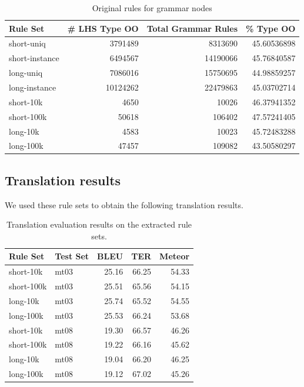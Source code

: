 \documentclass[11pt]{article}
\begin{document}
\begin{table}[tbh!]
  \begin{tabular}{lrrr}
  Rule Set & \# LHS Type OO & Total Grammar Rules & \% Type OO\\
  \hline
  short-uniq	& 3791489 &	8313690	& 45.60536898\\
  short-instance &	6494567 &	14190066 & 45.76840587\\
  long-uniq &	7086016 &	15750695 & 44.98859257\\
  long-instance & 10124262 & 22479863 & 45.03702714\\
  short-10k & 4650 & 10026 & 46.37941352\\
  short-100k & 50618 & 106402 & 47.57241405\\
  long-10k & 4583 & 10023 & 45.72483288\\
  long-100k & 47457 & 109082 & 43.50580297
  \end{tabular}
  \caption{Original rules for grammar nodes}
\end{table}

\subsection{Translation results}

We used these rule sets to obtain the following 
translation results.

\begin{table}[tbh!]
\begin{tabular}{llrrr}
Rule Set & Test Set & BLEU & TER & Meteor \\
\hline
short-10k & mt03 & 25.16 & 66.25 & 54.33 \\
short-100k & mt03 & 25.51 & 65.56 & 54.15 \\
long-10k & mt03 & 25.74  & 65.52 & 54.55 \\
long-100k & mt03 & 25.53 & 66.24 & 53.68 \\
\hline
short-10k & mt08 & 19.30  & 66.57 & 46.26\\
short-100k & mt08 & 19.22 & 66.16 & 45.62\\
long-10k & mt08 & 19.04  & 66.20 & 46.25\\
long-100k & mt08 & 19.12 & 67.02 & 45.26\\
\end{tabular}
\caption{Translation evaluation results on the extracted rule sets.}
\end{table}


\end{document}
